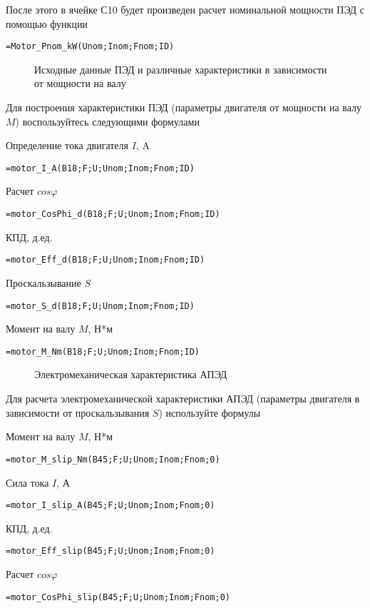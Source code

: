 После этого в ячейке С10 будет произведен расчет номинальной мощности ПЭД с помощью функции

{ \small  \texttt{=Motor\_Pnom\_kW(Unom;Inom;Fnom;ID)}}

\begin{figure}[h!]
	\center{\texttt{[image: Ex80\_1]}}
	\caption{Исходные данные ПЭД и различные характеристики в зависимости от мощности на валу}
	\label{ris:Ex80_1}
\end{figure}

Для построения характеристики ПЭД (параметры двигателя от мощности на валу $M$) воспользуйтесь следующими формулами

Определение тока двигателя $I$, A

{ \small  \texttt{=motor\_I\_A(B18;F;U;Unom;Inom;Fnom;ID)}}

Расчет $cos \varphi $

{ \small  \texttt{=motor\_CosPhi\_d(B18;F;U;Unom;Inom;Fnom;ID)}}

КПД, д.ед.

{ \small  \texttt{=motor\_Eff\_d(B18;F;U;Unom;Inom;Fnom;ID)}}

Проскальзывание $S$

{ \small  \texttt{=motor\_S\_d(B18;F;U;Unom;Inom;Fnom;ID)}}

Момент на валу $M$, Н*м

{ \small  \texttt{=motor\_M\_Nm(B18;F;U;Unom;Inom;Fnom;ID)}}

\begin{figure}[h!]
	\center{\texttt{[image: Ex80\_2]}}
	\caption{Электромеханическая характеристика АПЭД}
	\label{ris:Ex80_2}
\end{figure}

Для расчета электромеханической характеристики АПЭД (параметры двигателя в зависимости от проскальзывания $S$) используйте формулы

Момент на валу $M$, Н*м 

{ \small  \texttt{=motor\_M\_slip\_Nm(B45;F;U;Unom;Inom;Fnom;0)}}

Сила тока $I$, А

{ \small  \texttt{=motor\_I\_slip\_A(B45;F;U;Unom;Inom;Fnom;0)}}

КПД, д.ед.

{ \small  \texttt{=motor\_Eff\_slip(B45;F;U;Unom;Inom;Fnom;0)}}

Расчет $cos \varphi $

{ \small  \texttt{=motor\_CosPhi\_slip(B45;F;U;Unom;Inom;Fnom;0)}}


